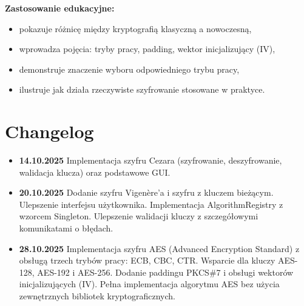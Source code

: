 \documentclass[12pt,a4paper]{article}
\begin{document}
\textbf{Zastosowanie edukacyjne:}
\begin{itemize}
    \item pokazuje różnicę między kryptografią klasyczną a nowoczesną,
    \item wprowadza pojęcia: tryby pracy, padding, wektor inicjalizujący (IV),
    \item demonstruje znaczenie wyboru odpowiedniego trybu pracy,
    \item ilustruje jak działa rzeczywiste szyfrowanie stosowane w praktyce.
\end{itemize}


\section{Changelog}
\label{sec:changelog}
\begin{itemize}
    \item \textbf{14.10.2025} Implementacja szyfru Cezara (szyfrowanie, deszyfrowanie, walidacja klucza) oraz podstawowe GUI.
    \item \textbf{20.10.2025} Dodanie szyfru Vigenère'a i szyfru z kluczem bieżącym. \newline Ulepszenie interfejsu użytkownika. \newline 
    Implementacja AlgorithmRegistry z wzorcem Singleton. 
    \newline Ulepszenie walidacji kluczy z szczegółowymi komunikatami o błędach.
    \item \textbf{28.10.2025} Implementacja szyfru AES (Advanced Encryption Standard) z obsługą trzech trybów pracy: ECB, CBC, CTR. \newline
    Wsparcie dla kluczy AES-128, AES-192 i AES-256. \newline
    Dodanie paddingu PKCS\#7 i obsługi wektorów inicjalizujących (IV). \newline
    Pełna implementacja algorytmu AES bez użycia zewnętrznych bibliotek kryptograficznych.
\end{itemize}
\end{document}
